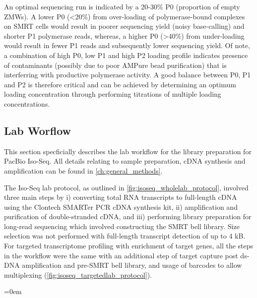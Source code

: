 An optimal sequencing run is indicated by a 20-30\% P0 (proportion of empty ZMWs). A lower P0 (<20\%) from over-loading of polymerase-bound complexes on SMRT cells would result in poorer sequencing yield (noisy base-calling) and shorter P1 polymerase reads, whereas, a higher P0 (>40\%) from under-loading would result in fewer P1 reads and subsequently lower sequencing yield. Of note, a combination of high P0, low P1 and high P2 loading profile indicates presence of contaminants (possibly due to poor AMPure bead purification) that is interferring with productive polymerase activity. A good balance between P0, P1 and P2 is therefore critical and can be achieved by determining an optimum loading concentration through performing titrations of multiple loading concentrations.

\subsection{Lab Worflow}
\label{chap:isoseq_labpipeline}
This section specficially describes the lab workflow for the library preparation for PacBio Iso-Seq. All details relating to sample preparation, cDNA synthesis and amplification can be found in \cref{ch:general_methods}.

The Iso-Seq lab protocol, as outlined in \cref{fig:isoseq_wholelab_protocol}, involved three main steps by i) converting total RNA transcripts to full-length cDNA using the Clontech SMARTer PCR cDNA synthesis kit, ii) amplification and purification of double-stranded cDNA, and iii) performing library preparation for long-read sequencing which involved constructing the SMRT bell library. Size selection was not performed with full-length transcript detection of up to 4 kB. For targeted transcriptome profiling with enrichment of target genes, all the steps in the workflow were the same with an additional step of target capture post ds-DNA amplification and pre-SMRT bell library, and usage of barcodes to allow multiplexing (\cref{fig:isoseq_targetedlab_protocol}). 

\begingroup
\parindent=0em
\localtableofcontents 
\endgroup

